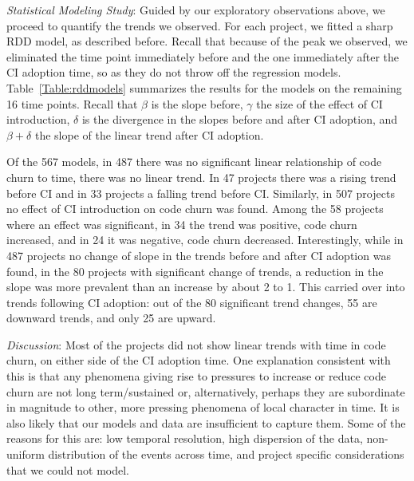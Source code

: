 

\smallskip\noindent \emph{Statistical Modeling Study}: 
Guided by our exploratory observations above, we proceed to 
quantify the trends we observed.
For each project, we fitted a sharp RDD model, as described before.
Recall that because of the peak we observed, we eliminated the time point 
immediately before and the one immediately after the CI adoption time, so as 
they do not throw off the regression models.
Table~\ref{Table:rddmodels} summarizes the results for the models on the 
remaining 16 time points.
Recall that $\beta$ is the slope before, $\gamma$ the size of the effect of 
CI introduction, $\delta$ is the divergence in the slopes before and after CI 
adoption, and $\beta + \delta$ the slope of the linear trend after CI adoption.

Of the 567 models, in 487 there was no significant linear relationship of 
code churn to time, \ie there was no linear trend.
In 47 projects there was a rising trend before CI and in 33 projects a falling 
trend before CI.
Similarly, in 507 projects no effect of CI introduction on code churn was found. 
Among the 58 projects where an effect was significant, in 34 the trend was 
positive, \ie code churn increased, and in 24 it was negative, \ie code churn 
decreased.
Interestingly, while in 487 projects no change of slope in the trends before 
and after CI adoption was found, in the 80 projects with significant change 
of trends, a reduction in the slope was more prevalent than an increase by 
about 2 to 1.
This carried over into trends following CI adoption: out of the 80 significant 
trend changes, 55 are downward trends, and only 25 are upward.



\smallskip\noindent \emph{Discussion}:
Most of the projects did not show linear trends with time in code churn, on 
either side of the CI adoption time.
One explanation consistent with this is that any phenomena giving rise to 
pressures to increase or reduce code churn are not long term/sustained or, 
alternatively, perhaps they are subordinate in magnitude to other, more 
pressing phenomena of local character in time.
It is also likely that our models and data are insufficient to capture them.
Some of the reasons for this are: low temporal resolution, high dispersion 
of the data, non-uniform distribution of the events across time, and project 
specific considerations that we could not model.

